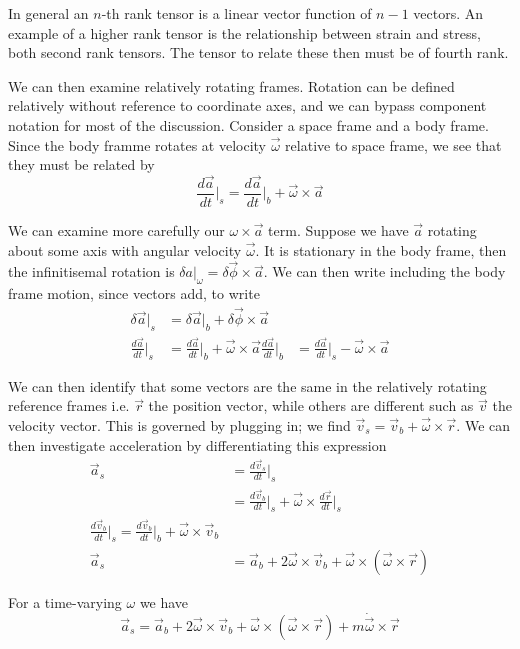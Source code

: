 \documentclass[10pt]{report}
\newcommand{\rd}[2]{\frac{d#1}{d#2}}
\begin{document}
In general an $n$-th rank tensor is a linear vector function of $n-1$ vectors. An example of a higher rank tensor is the relationship between strain and stress, both second rank tensors. The tensor to relate these then must be of fourth rank.

We can then examine relatively rotating frames. Rotation can be defined relatively without reference to coordinate axes, and we can bypass component notation for most of the discussion. Consider a space frame and a body frame. Since the body framme rotates at velocity $\vec{\omega}$ relative to space frame, we see that they must be related by
$$\rd{\vec{a}}{t}\Big|_s = \rd{\vec{a}}{t}\Big|_b + \vec{\omega}\times \vec{a}$$

We can examine more carefully our $\omega \times \vec{a}$ term. Suppose we have $\vec{a}$ rotating about some axis with angular velocity $\vec{\omega}$. It is stationary in the body frame, then the infinitisemal rotation is $\delta a|_\omega = \delta\vec{\phi} \times \vec{a}$. We can then write including the body frame motion, since vectors add, to write
\begin{align*}
    \delta \vec{a}|_s &= \delta \vec{a}|_b + \delta \vec{\phi} \times \vec{a}\\
    \rd{\vec{a}}{t}\Big|_s &= \rd{\vec{a}}{t}\Big|_b + \vec{\omega}\times \vec{a}
    \rd{\vec{a}}{t}\Big|_b &= \rd{\vec{a}}{t}\Big|_s - \vec{\omega}\times \vec{a}
\end{align*}

We can then identify that some vectors are the same in the relatively rotating reference frames i.e. $\vec{r}$ the position vector, while others are different such as $\vec{v}$ the velocity vector. This is governed by plugging in; we find $\vec{v}_s = \vec{v}_b + \vec{\omega} \times \vec{r}$. We can then investigate acceleration by differentiating this expression
\begin{align*}
    \vec{a}_s &= \rd{\vec{v}_s}{t}\Big|_s\\
    &= \rd{\vec{v}_b}{t}\Big|_s + \vec{\omega}\times \rd{\vec{r}}{t}\Big|_s\\
    \rd{\vec{v}_b}{t}\Big|_s = \rd{\vec{v}_b}{t}\Big|_b + \vec{\omega}\times \vec{v}_b\\
    \vec{a}_s &=\vec{a}_b + 2\vec{\omega} \times \vec{v}_b + \vec{\omega}\times\left( \vec{\omega}\times \vec{r} \right)
\end{align*}

For a time-varying $\omega$ we have
$$\vec{a}_s =\vec{a}_b + 2\vec{\omega} \times \vec{v}_b + \vec{\omega}\times\left( \vec{\omega}\times \vec{r} \right) + m\dot{\vec{\omega}}\times \vec{r}$$
\end{document}
